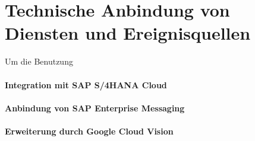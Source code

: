 \section{Technische Anbindung von Diensten und Ereignisquellen}\label{sec:integration}
Um die Benutzung 

\paragraph{Integration mit SAP S/4HANA Cloud}


\paragraph{Anbindung von SAP Enterprise Messaging}


\paragraph{Erweiterung durch Google Cloud Vision}





